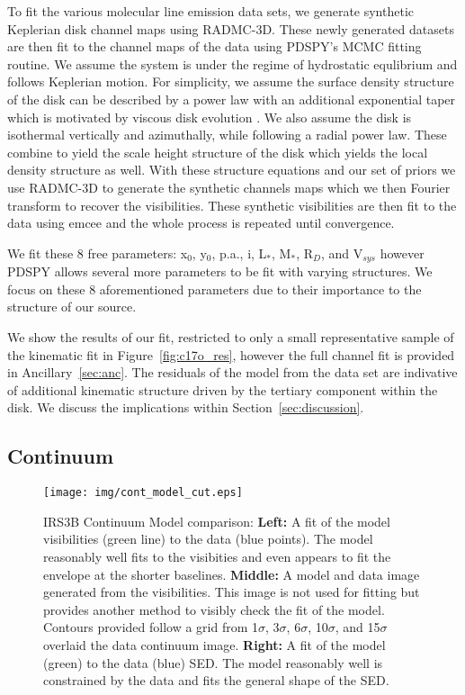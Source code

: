 \documentclass[preprint,12pt]{aastex62}
\begin{document}
To fit the various molecular line emission data sets, we generate synthetic Keplerian disk channel maps using RADMC-3D. These newly generated datasets are then fit to the channel maps of the data using PDSPY's MCMC fitting routine. We assume the system is under the regime of hydrostatic equlibrium and follows Keplerian motion. For simplicity, we assume the surface density structure of the disk can be described by a power law with an additional exponential taper which is motivated by viscous disk evolution \citep[Pringle Disk][]{1974MNRAS.168..603L}. We also assume the disk is isothermal vertically and azimuthally, while following a radial power law. These combine to yield the scale height structure of the disk which yields the local density structure as well. With these structure equations and our set of priors we use RADMC-3D to generate the synthetic channels maps which we then Fourier transform to recover the visibilities. These synthetic visibilities are then fit to the data using emcee and the whole process is repeated until convergence.

We fit these 8 free parameters: x$_{0}$, y$_{0}$, p.a., i, L$_*$, M$_*$, R$_D$, and V$_{sys}$ however PDSPY allows several more parameters to be fit with varying structures. We focus on these 8 aforementioned parameters due to their importance to the structure of our source.

We show the results of our fit, restricted to only a small representative sample of the kinematic fit in Figure~\ref{fig:c17o_res}, however the full channel fit is provided in Ancillary~\ref{sec:anc}. The residuals of the model from the data set are indivative of additional kinematic structure driven by the tertiary component within the disk. We discuss the implications within Section~\ref{sec:discussion}.


\subsection{Continuum}
\begin{figure}[H]
\begin{center}
\texttt{[image: img/cont\_model\_cut.eps]}
\end{center}
\caption{IRS3B Continuum Model comparison: \textbf{Left:} A fit of the model visibilities (green line) to the data (blue points). The model reasonably well fits to the visibities and even appears to fit the envelope at the shorter baselines. \textbf{Middle:} A model and data image generated from the visibilities. This image is not used for fitting but provides another method to visibly check the fit of the model. Contours provided follow a grid from 1$\sigma$, 3$\sigma$, 6$\sigma$, 10$\sigma$, and 15$\sigma$ overlaid the data continuum image. \textbf{Right:} A fit of the model (green) to the data (blue) SED. The model reasonably well is constrained by the data and fits the general shape of the SED.}\label{fig:cont_model_cut}
\end{figure}
\end{document}
